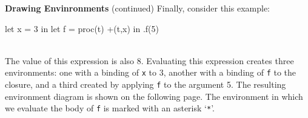 \begin{minipage}[t]{\sw}
\slidenumber
\LARGE
{\bf Drawing Envinronments} (continued)\exx
Finally, consider this example:\\[1.5ex]
\Large
\begin{verbbox}
let
  x = 3
in
  let
    f = proc(t) +(t,x)
  in
    .f(5)
\end{verbbox}
\emm\theverbbox\\[1.5ex]
\LARGE
The value of this expression is also 8.
Evaluating this expression creates three environments:
one with a binding of \verb'x' to 3,
another with a binding of \verb'f' to the closure,
and a third created by applying \verb'f' to the argument 5.
The resulting environment diagram is shown
on the following page.
The environment in which we evaluate the body of \verb'f'
is marked with an asterisk `\verb'*''.
\end{minipage}
\clearpage
